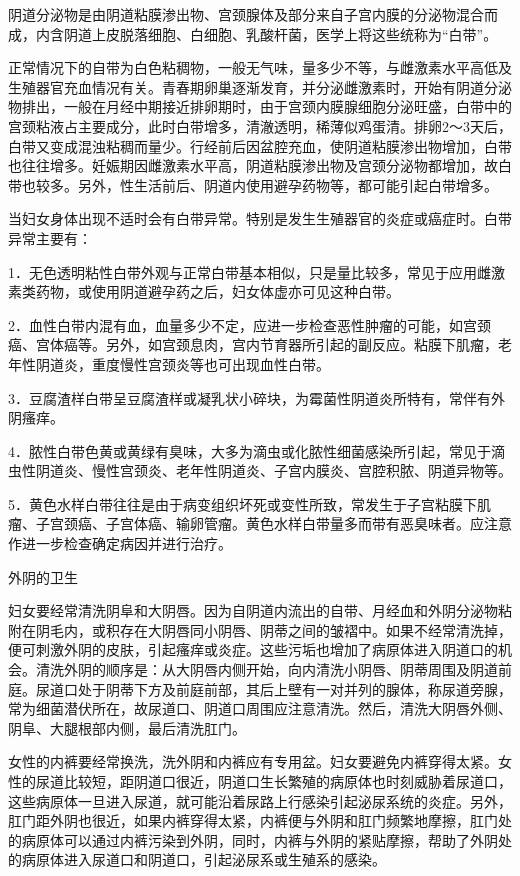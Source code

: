 \documentclass[12pt,UTF8]{ctexbook}
\begin{document}
阴道分泌物是由阴道粘膜渗出物、宫颈腺体及部分来自子宫内膜的分泌物混合而成，内含阴道上皮脱落细胞、白细胞、乳酸杆菌，医学上将这些统称为“白带”。

正常情况下的自带为白色粘稠物，一般无气味，量多少不等，与雌激素水平高低及生殖器官充血情况有关。青春期卵巢逐渐发育，并分泌雌激素时，开始有阴道分泌物排出，一般在月经中期接近排卵期时，由于宫颈内膜腺细胞分泌旺盛，白带中的宫颈粘液占主要成分，此时白带增多，清澈透明，稀薄似鸡蛋清。排卵2～3天后，白带又变成混浊粘稠而量少。行经前后因盆腔充血，使阴道粘膜渗出物增加，白带也往往增多。妊娠期因雌激素水平高，阴道粘膜渗出物及宫颈分泌物都增加，故白带也较多。另外，性生活前后、阴道内使用避孕药物等，都可能引起白带增多。

当妇女身体出现不适时会有白带异常。特别是发生生殖器官的炎症或癌症时。白带异常主要有：

1．无色透明粘性白带外观与正常白带基本相似，只是量比较多，常见于应用雌激素类药物，或使用阴道避孕药之后，妇女体虚亦可见这种白带。

2．血性白带内混有血，血量多少不定，应进一步检查恶性肿瘤的可能，如宫颈癌、宫体癌等。另外，如宫颈息肉，宫内节育器所引起的副反应。粘膜下肌瘤，老年性阴道炎，重度慢性宫颈炎等也可出现血性白带。

3．豆腐渣样白带呈豆腐渣样或凝乳状小碎块，为霉菌性阴道炎所特有，常伴有外阴瘙痒。

4．脓性白带色黄或黄绿有臭味，大多为滴虫或化脓性细菌感染所引起，常见于滴虫性阴道炎、慢性宫颈炎、老年性阴道炎、子宫内膜炎、宫腔积脓、阴道异物等。

5．黄色水样白带往往是由于病变组织坏死或变性所致，常发生于子宫粘膜下肌瘤、子宫颈癌、子宫体癌、输卵管瘤。黄色水样白带量多而带有恶臭味者。应注意作进一步检查确定病因并进行治疗。

外阴的卫生

妇女要经常清洗阴阜和大阴唇。因为自阴道内流出的自带、月经血和外阴分泌物粘附在阴毛内，或积存在大阴唇同小阴唇、阴蒂之间的皱褶中。如果不经常清洗掉，便可刺激外阴的皮肤，引起瘙痒或炎症。这些污垢也增加了病原体进入阴道口的机会。清洗外阴的顺序是：从大阴唇内侧开始，向内清洗小阴唇、阴蒂周围及阴道前庭。尿道口处于阴蒂下方及前庭前部，其后上壁有一对并列的腺体，称尿道旁腺，常为细菌潜伏所在，故尿道口、阴道口周围应注意清洗。然后，清洗大阴唇外侧、阴阜、大腿根部内侧，最后清洗肛门。

女性的内裤要经常换洗，洗外阴和内裤应有专用盆。妇女要避免内裤穿得太紧。女性的尿道比较短，距阴道口很近，阴道口生长繁殖的病原体也时刻威胁着尿道口，这些病原体一旦进入尿道，就可能沿着尿路上行感染引起泌尿系统的炎症。另外，肛门距外阴也很近，如果内裤穿得太紧，内裤便与外阴和肛门频繁地摩擦，肛门处的病原体可以通过内裤污染到外阴，同时，内裤与外阴的紧贴摩擦，帮助了外阴处的病原体进入尿道口和阴道口，引起泌尿系或生殖系的感染。
\end{document}
